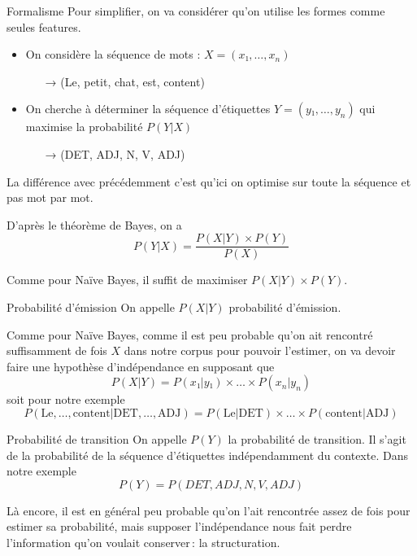 \documentclass[hyperref={unicode}, xcolor={svgnames}, french]{beamer}
\begin{document}
\begin{frame}{Formalisme}
	Pour simplifier, on va considérer qu'on utilise les formes comme seules features.

	\begin{itemize}
		\item On considère la séquence de mots : $X=(x₁, …, x_n)$
			\begin{itemize}
				\item[→] (Le, petit, chat, est, content)
			\end{itemize}
		\item On cherche à déterminer la séquence d'étiquettes $Y=(y₁, …, y_n)$ qui maximise la probabilité $P(Y|X)$
			\begin{itemize}
				\item[→] (DET, ADJ, N, V, ADJ)
			\end{itemize}
	\end{itemize}

	La différence avec précédemment c'est qu'ici on optimise sur toute la séquence et pas mot par mot.

	\pause

	D'après le théorème de Bayes, on a
	\begin{equation}
		P(Y|X) = \frac{P(X|Y)×P(Y)}{P(X)}
	\end{equation}

	Comme pour Naïve Bayes, il suffit de maximiser $P(X|Y)×P(Y)$.
\end{frame}

\begin{frame}{Probabilité d'émission}
	On appelle $P(X|Y)$ \alert{probabilité d'émission}.

	Comme pour Naïve Bayes, comme il est peu probable qu'on ait rencontré suffisamment de fois $X$ dans notre corpus pour pouvoir l'estimer, on va devoir faire une hypothèse d'indépendance en supposant que
	\begin{equation}
		P(X|Y) = P(x₁|y₁) × … × P(x_n|y_n)
	\end{equation}
	soit pour notre exemple
	\begin{equation}
		P(\text{Le}, …, \text{content}|\text{DET}, …, \text{ADJ}) = P(\text{Le}|\text{DET}) × … × P(\text{content}|\text{ADJ})
	\end{equation}
\end{frame}

\begin{frame}{Probabilité de transition}
	On appelle $P(Y)$ la \alert{probabilité de transition}.
	Il s'agit de la probabilité de la séquence d'étiquettes indépendamment du contexte.
	Dans notre exemple
	\begin{equation}
		P(Y) = P(DET, ADJ, N, V, ADJ)
	\end{equation}

	Là encore, il est en général peu probable qu'on l'ait rencontrée assez de fois pour estimer sa probabilité, mais supposer l'indépendance nous fait perdre l'information qu'on voulait conserver : \alert{la structuration}.
\end{frame}
\end{document}
